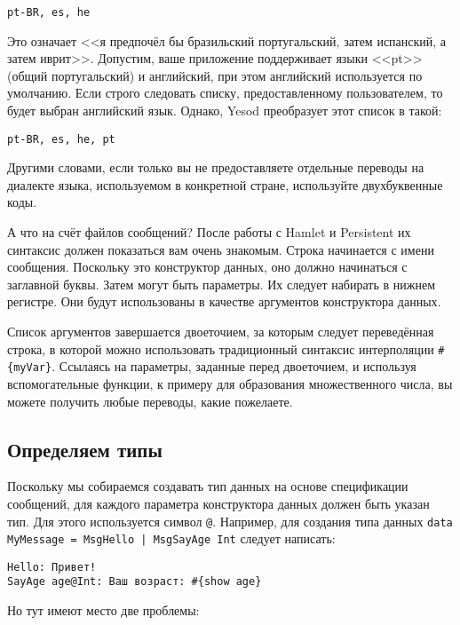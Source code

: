 \begin{lstlisting}
pt-BR, es, he
\end{lstlisting}

Это означает <<я предпочёл бы бразильский португальский, затем испанский, а
затем иврит>>. Допустим, ваше приложение поддерживает языки <<pt>> (общий
португальский) и английский, при этом английский используется по умолчанию.
Если строго следовать списку, предоставленному пользователем, то будет выбран
английский язык. Однако, Yesod преобразует этот список в такой:

\begin{lstlisting}
pt-BR, es, he, pt
\end{lstlisting}

Другими словами, если только вы не предоставляете отдельные переводы на
диалекте языка, используемом в конкретной стране, используйте двухбуквенные
коды.

А что на счёт файлов сообщений? После работы с Hamlet и Persistent их синтаксис
должен показаться вам очень знакомым. Строка начинается с имени сообщения.
Поскольку это конструктор данных, оно должно начинаться с заглавной буквы.
Затем могут быть параметры. Их следует набирать в нижнем регистре. Они будут
использованы в качестве аргументов конструктора данных.

Список аргументов завершается двоеточием, за которым следует переведённая
строка, в которой можно использовать традиционный синтаксис интерполяции
\lstinline'#{myVar}'. Ссылаясь на параметры, заданные перед двоеточием, и
используя вспомогательные функции, к примеру для образования множественного
числа, вы можете получить любые переводы, какие пожелаете.

\subsection{Определяем типы}

Поскольку мы собираемся создавать тип данных на основе спецификации сообщений,
для каждого параметра конструктора данных должен быть указан тип. Для этого
используется символ \verb'@'. Например, для создания типа данных
\lstinline'data MyMessage = MsgHello | MsgSayAge Int' следует написать:

\begin{lstlisting}
Hello: Привет!
SayAge age@Int: Ваш возраст: #{show age}
\end{lstlisting}

Но тут имеют место две проблемы:

